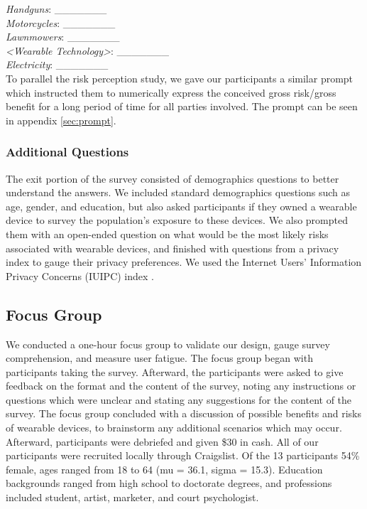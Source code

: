 \documentclass{acm_proc_article-sp}
\begin{document}
\textit{Handguns}: \_\_\_\_\_\_\_ \\
\textit{Motorcycles}: \_\_\_\_\_\_\_\\
\textit{Lawnmowers}: \_\_\_\_\_\_\_\\
\textit{<Wearable Technology>}: \_\_\_\_\_\_\_\\
\textit{Electricity}: \_\_\_\_\_\_\_\\ [-.5cm]

To parallel the risk perception study, we gave our participants a similar prompt which instructed them to numerically express the conceived gross risk/gross benefit for a long period of time for all parties involved. The prompt can be seen in appendix \ref{sec:prompt}. 

\subsubsection{Additional Questions}
The exit portion of the survey consisted of demographics questions to better understand the answers. We included standard demographics questions such as age, gender, and education, but also asked participants if they owned a wearable device to survey the population's exposure to these devices. We also prompted them with an open-ended question on what would be the most likely risks associated with wearable devices, and finished with questions from a privacy index to gauge their privacy preferences. We used the Internet Users' Information Privacy Concerns (IUIPC) index \cite{malhotra2004internet}.

\subsection{Focus Group}
We conducted a one-hour focus group to validate our design, gauge survey comprehension, and measure user fatigue. The focus group began with participants taking the survey. Afterward, the participants were asked to give feedback on the format and the content of the survey, noting any instructions or questions which were unclear and stating any suggestions for the content of the survey. The focus group concluded with a discussion of possible benefits and risks of wearable devices, to brainstorm any additional scenarios which may occur. Afterward, participants were debriefed and given \$30 in cash. All of our participants were recruited locally through Craigslist. Of the 13 participants 54\% female, ages ranged from 18 to 64 (mu = 36.1, sigma = 15.3).  Education backgrounds ranged from high school to doctorate degrees, and professions included student, artist, marketer, and court psychologist.
\end{document}
